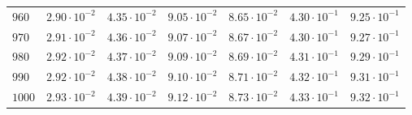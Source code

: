\begin{table}[h]
\begin{tabular}{lcccccc}
$	960	$ & $	2.90 \cdot 10^{-2}	$ & $	4.35 \cdot 10^{-2}	$ & $	9.05 \cdot 10^{-2}	$ & $	8.65 \cdot 10^{-2}	$ & $	4.30 \cdot 10^{-1}	$ & $	9.25 \cdot 10^{-1}	$ \\
$	970	$ & $	2.91 \cdot 10^{-2}	$ & $	4.36 \cdot 10^{-2}	$ & $	9.07 \cdot 10^{-2}	$ & $	8.67 \cdot 10^{-2}	$ & $	4.30 \cdot 10^{-1}	$ & $	9.27 \cdot 10^{-1}	$ \\
$	980	$ & $	2.92 \cdot 10^{-2}	$ & $	4.37 \cdot 10^{-2}	$ & $	9.09 \cdot 10^{-2}	$ & $	8.69 \cdot 10^{-2}	$ & $	4.31 \cdot 10^{-1}	$ & $	9.29 \cdot 10^{-1}	$ \\
$	990	$ & $	2.92 \cdot 10^{-2}	$ & $	4.38 \cdot 10^{-2}	$ & $	9.10 \cdot 10^{-2}	$ & $	8.71 \cdot 10^{-2}	$ & $	4.32 \cdot 10^{-1}	$ & $	9.31 \cdot 10^{-1}	$ \\
$	1000	$ & $	2.93 \cdot 10^{-2}	$ & $	4.39 \cdot 10^{-2}	$ & $	9.12 \cdot 10^{-2}	$ & $	8.73 \cdot 10^{-2}	$ & $	4.33 \cdot 10^{-1}	$ & $	9.32 \cdot 10^{-1}	$ \\
\hline
  \end{tabular}
  \end{table}


